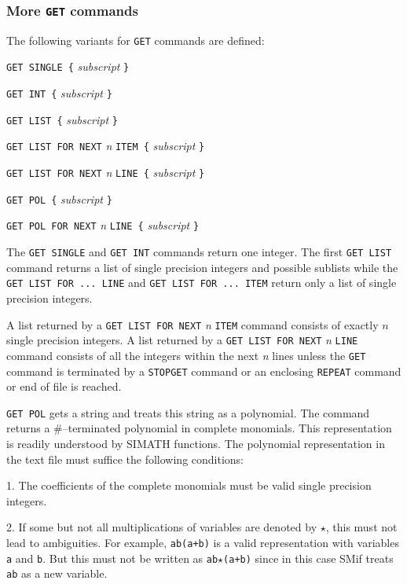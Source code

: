\documentclass{article}
\begin{document}
\subsubsection{More \texttt{GET} commands}

The following variants for \texttt{GET} commands are defined:

\texttt{GET SINGLE \{} \emph{subscript} \texttt{\}}

\texttt{GET INT \{} \emph{subscript} \texttt{\}}

\texttt{GET LIST \{} \emph{subscript} \texttt{\}}

\texttt{GET LIST FOR NEXT} \emph{n} \texttt{ITEM \{} \emph{subscript}
\texttt{\}}

\texttt{GET LIST FOR NEXT} \emph{n} \texttt{LINE \{} \emph{subscript}
\texttt{\}}

\texttt{GET POL \{} \emph{subscript} \texttt{\}}

\texttt{GET POL FOR NEXT} \emph{n} \texttt{LINE \{} \emph{subscript}
\texttt{\}}

The \texttt{GET SINGLE} and \texttt{GET INT} commands return one
integer.  The first \texttt{GET LIST} command returns a list of single
precision integers and possible sublists while the \texttt{GET LIST
  FOR ... LINE} and \texttt{GET LIST FOR ... ITEM} return only a list
of single precision integers.

A list returned by a \texttt{GET LIST FOR NEXT} \emph{n} \texttt{ITEM}
command consists of exactly $n$ single precision integers.  A list
returned by a \texttt{GET LIST FOR NEXT} \emph{n} \texttt{LINE}
command consists of all the integers within the next \emph{n} lines
unless the \texttt{GET} command is terminated by a \texttt{STOPGET}
command or an enclosing \texttt{REPEAT} command or end of file is
reached.

\texttt{GET POL} gets a string and treats this string as a polynomial.
The command returns a \#--terminated polynomial in complete monomials.
This representation is readily understood by SIMATH functions. The
polynomial representation in the text file must suffice the following
conditions:

1. The coefficients of the complete monomials must be valid single
precision integers.

2. If some but not all multiplications of variables are denoted by
\texttt{$\star$}, this must not lead to ambiguities. For example,
\texttt{ab(a+b)} is a valid representation with variables \texttt{a}
and \texttt{b}. But this must not be written as
\texttt{ab$\star$(a+b)} since in this case SMif treats \texttt{ab} as
a new variable.
\end{document}
